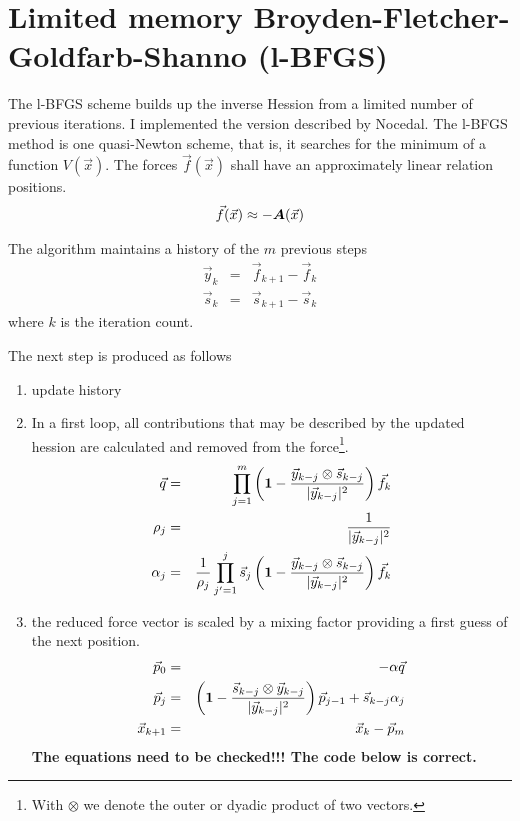 \documentclass[11pt,a4paper]{report}
\begin{document}
%
\section{Limited memory Broyden-Fletcher-Goldfarb-Shanno (l-BFGS)}
The l-BFGS scheme builds up the inverse Hession from a limited number
of previous iterations. I implemented the version described by
Nocedal\cite{nocedal80_mathcomp35_773}. The l-BFGS method is one
quasi-Newton scheme, that is, it searches for the minimum of a
function $V(\vec{x})$.  The forces $\vec{f}(\vec{x})$ shall have an
approximately linear relation positions.
\begin{eqnarray}
\vec{f}(\vec{x})\approx-\bm{A}(\vec{x})
\end{eqnarray}

The algorithm maintains a history of the $m$ previous steps
\begin{eqnarray}
\vec{y}_k&=&\vec{f}_{k+1}-\vec{f}_k
\nonumber\\
\vec{s}_k&=&\vec{s}_{k+1}-\vec{s}_k
\end{eqnarray}
where $k$ is the iteration count.

The next step is produced as follows
\begin{enumerate}
\item update history 
\item In a first loop, all contributions that may be described by the
  updated hession are calculated and removed from the
  force\footnote{With $\otimes$ we denote the outer or dyadic
    product of two vectors.}.
\begin{eqnarray}
\vec{q}&=&\prod_{j=1}^{m} 
\left(\bm{1}-\frac{\vec{y}_{k-j}\otimes\vec{s}_{k-j}}{|\vec{y}_{k-j}|^2}\right)\vec{f}_k
\nonumber\\
\rho_j&=&\frac{1}{|\vec{y}_{k-j}|^2}
\nonumber\\
\alpha_j&=&\frac{1}{\rho_j}
\prod_{j'=1}^{j} \vec{s}_j
\left(\bm{1}-\frac{\vec{y}_{k-j}\otimes\vec{s}_{k-j}}{|\vec{y}_{k-j}|^2}\right)\vec{f}_k
\end{eqnarray}

\item the reduced force vector is scaled by a mixing factor providing
  a first guess of the next position.
\begin{eqnarray}
\vec{p}_0&=&-\alpha\vec{q}
\\
\vec{p}_j&=&\left(\bm{1}-\frac{\vec{s}_{k-j}\otimes\vec{y}_{k-j}}{|\vec{y}_{k-j}|^2}\right)\vec{p}_{j-1}
+\vec{s}_{k-j}\alpha_j
\\
\vec{x}_{k+1}&=&\vec{x}_k-\vec{p}_m
\end{eqnarray}
\textbf{The equations need to be checked!!! The code below is correct.}
\end{enumerate}
\end{document}
